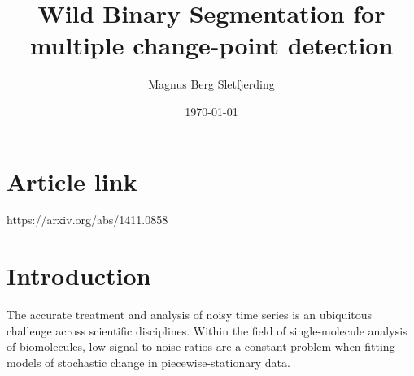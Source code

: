 \documentclass[%
 reprint,
 amsmath,amssymb,
 aps,
]{revtex4-1}
\begin{document}

\title{Wild Binary Segmentation for multiple change-point detection}%

\author{Magnus Berg Sletfjerding}

%


\date{\today}%
%
%

\maketitle


\section*{Article link}
https://arxiv.org/abs/1411.0858

\section{Introduction}
The accurate treatment and analysis of noisy time series is an ubiquitous challenge across scientific disciplines.
Within the field of single-molecule analysis of biomolecules, low signal-to-noise ratios are a constant problem when fitting models of stochastic change in piecewise-stationary data.
\end{document}
